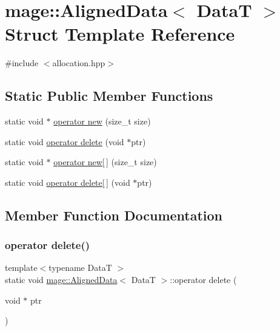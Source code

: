 \hypertarget{structmage_1_1_aligned_data}{}\section{mage\+:\+:Aligned\+Data$<$ DataT $>$ Struct Template Reference}
\label{structmage_1_1_aligned_data}


{\ttfamily \#include $<$allocation.\+hpp$>$}

\subsection*{Static Public Member Functions}
\begin{DoxyCompactItemize}
\item 
static void $\ast$ \hyperlink{structmage_1_1_aligned_data_a0ddb884f1857519ceaf10d8980ff896b}{operator new} (size\+\_\+t size)
\item 
static void \hyperlink{structmage_1_1_aligned_data_a405d74d763ee31a67f9a94a84f722ce7}{operator delete} (void $\ast$ptr)
\item 
static void $\ast$ \hyperlink{structmage_1_1_aligned_data_a139865ffc435aebff7703d68d8111f24}{operator new\mbox{[}$\,$\mbox{]}} (size\+\_\+t size)
\item 
static void \hyperlink{structmage_1_1_aligned_data_a3402092ab9bc62fcd9732f797fc44570}{operator delete\mbox{[}$\,$\mbox{]}} (void $\ast$ptr)
\end{DoxyCompactItemize}


\subsection{Member Function Documentation}
\hypertarget{structmage_1_1_aligned_data_a405d74d763ee31a67f9a94a84f722ce7}{}\label{structmage_1_1_aligned_data_a405d74d763ee31a67f9a94a84f722ce7} 
\subsubsection{\texorpdfstring{operator delete()}{operator delete()}}
{\footnotesize\ttfamily template$<$typename DataT $>$ \\
static void \hyperlink{structmage_1_1_aligned_data}{mage\+::\+Aligned\+Data}$<$ DataT $>$\+::operator delete (\begin{DoxyParamCaption}\item[{void $\ast$}]{ptr }\end{DoxyParamCaption})\hspace{0.3cm}{\ttfamily [static]}}

